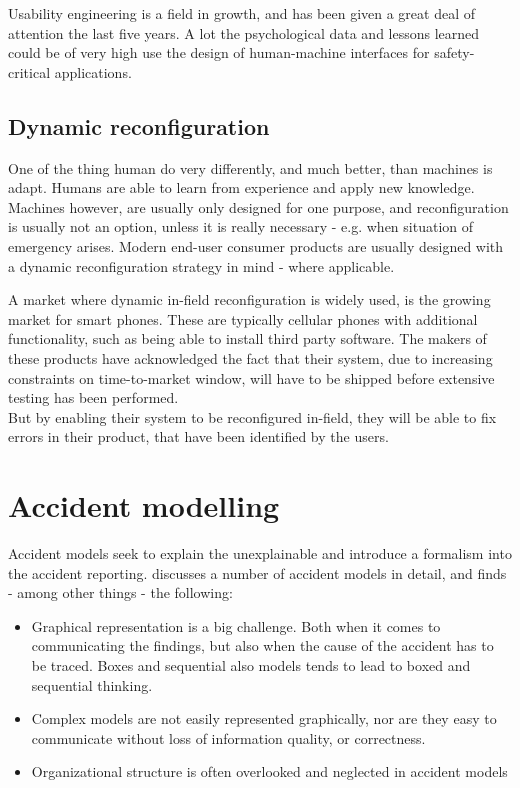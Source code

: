 \documentclass[10pt,oneside]{book}                  %
\begin{document}
Usability engineering is a field in growth, and has been given a great deal of attention the last five years. A lot the psychological data and lessons learned could be of very high use the design of human-machine interfaces for safety-critical applications.

\section{Dynamic reconfiguration}
One of the thing human do very differently, and much better, than machines is adapt. Humans are able to learn from experience and apply new knowledge. Machines however, are usually only designed for one purpose, and reconfiguration is usually not an option, unless it is really necessary - e.g. when situation of emergency arises.
Modern end-user consumer products are usually designed with a dynamic reconfiguration strategy in mind - where applicable.

A market where dynamic in-field reconfiguration is widely used, is the growing market for smart phones. These are typically cellular phones with additional functionality, such as being able to install third party software. The makers of these products have acknowledged the fact that their system, due to increasing constraints on time-to-market window, will have to be shipped before extensive testing has been performed.\\
But by enabling their system to be reconfigured in-field, they will be able to fix errors in their product, that have been identified by the users.

\markboth{}{}
\chapter{Accident modelling}
\label{ch:accident_modelling}
Accident models seek to explain the unexplainable and introduce a formalism into the accident reporting.
\cite{hollnagel2004barriers} discusses a number of accident models in detail, and finds - among other things - the following:

\begin{itemize}
\item Graphical representation is a big challenge. Both when it comes to communicating the findings, but also when the cause of the accident has to be traced. Boxes and sequential also models tends to lead to boxed and sequential thinking.
\item Complex models are not easily represented graphically, nor are they easy to communicate without loss of information quality, or correctness.
\item Organizational structure is often overlooked and neglected in accident models
\end{itemize}
\end{document}

